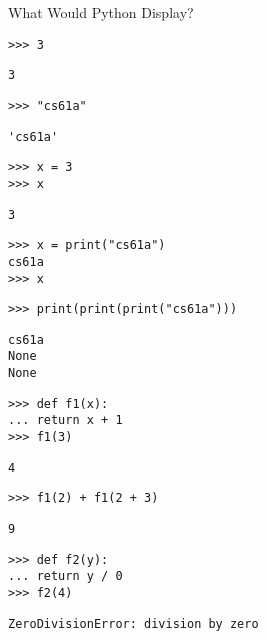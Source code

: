 \question What Would Python Display?

\begin{lstlisting}
>>> 3
\end{lstlisting}
\begin{solution}[.2in]
\lstinline{3}
\end{solution}

\begin{lstlisting}
>>> "cs61a"
\end{lstlisting}
\begin{solution}[.2in]
    \lstinline{'cs61a'}
\end{solution}

\begin{lstlisting}
>>> x = 3
>>> x
\end{lstlisting}
\begin{solution}[.2in]
    \lstinline{3}
\end{solution}

\begin{lstlisting}
>>> x = print("cs61a")
cs61a
>>> x
\end{lstlisting}
\begin{solution}[.2in]
    \lstinline{}
\end{solution}

\begin{lstlisting}
>>> print(print(print("cs61a")))
\end{lstlisting}
\begin{solution}[.6in]
\begin{lstlisting}
cs61a 
None 
None
\end{lstlisting}
\end{solution}

\begin{lstlisting}
>>> def f1(x):
...	return x + 1
>>> f1(3)
\end{lstlisting}
\begin{solution}[.2in]
    \lstinline{4}
\end{solution}

\begin{lstlisting}
>>> f1(2) + f1(2 + 3)
\end{lstlisting}
\begin{solution}[.2in]
    \lstinline{9}
\end{solution}

\begin{lstlisting}
>>> def f2(y):
...	return y / 0
>>> f2(4)
\end{lstlisting}
\begin{solution}[.2in]
    \lstinline{ZeroDivisionError: division by zero}
\end{solution}

